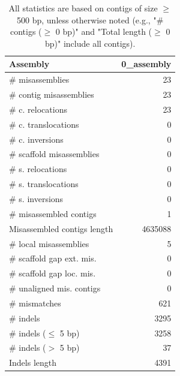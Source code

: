 \documentclass[12pt,a4paper]{article}
\begin{document}
\begin{table}[ht]
\begin{center}
\caption{All statistics are based on contigs of size $\geq$ 500 bp, unless otherwise noted (e.g., "\# contigs ($\geq$ 0 bp)" and "Total length ($\geq$ 0 bp)" include all contigs).}
\begin{tabular}{|l*{1}{|r}|}
\hline
Assembly & 0\_assembly \\ \hline
\# misassemblies & 23 \\ \hline
\hspace{2mm}\# contig misassemblies & 23 \\ \hline
\hspace{5mm}\# c. relocations & 23 \\ \hline
\hspace{5mm}\# c. translocations & 0 \\ \hline
\hspace{5mm}\# c. inversions & 0 \\ \hline
\hspace{2mm}\# scaffold misassemblies & 0 \\ \hline
\hspace{5mm}\# s. relocations & 0 \\ \hline
\hspace{5mm}\# s. translocations & 0 \\ \hline
\hspace{5mm}\# s. inversions & 0 \\ \hline
\# misassembled contigs & 1 \\ \hline
Misassembled contigs length & 4635088 \\ \hline
\# local misassemblies & 5 \\ \hline
\# scaffold gap ext. mis. & 0 \\ \hline
\# scaffold gap loc. mis. & 0 \\ \hline
\# unaligned mis. contigs & 0 \\ \hline
\# mismatches & 621 \\ \hline
\# indels & 3295 \\ \hline
\hspace{5mm}\# indels ($\leq$ 5 bp) & 3258 \\ \hline
\hspace{5mm}\# indels ($>$ 5 bp) & 37 \\ \hline
Indels length & 4391 \\ \hline
\end{tabular}
\end{center}
\end{table}
\end{document}
